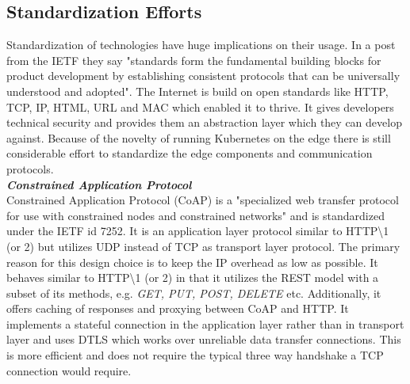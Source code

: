 \subsection{Standardization Efforts}
Standardization of technologies have huge implications on their usage. In a post from the IETF they say "standards form the fundamental building blocks for product development by establishing consistent protocols that can be universally understood and adopted". The Internet is build on open standards like HTTP, TCP, IP, HTML, URL and MAC which enabled it to thrive. It gives developers technical security and provides them an abstraction layer which they can develop against. Because of the novelty of running Kubernetes on the edge there is still considerable effort to standardize the edge components and communication protocols.\\[5mm]
{\textbf{\textit{Constrained Application Protocol}}}\\
Constrained Application Protocol (CoAP) is a "specialized web transfer protocol for use with constrained nodes and constrained networks"\cite{CoAPCon75:online} and is standardized under the IETF id 7252\cite{RFC7252CoAPIETF}. It is an application layer protocol similar to HTTP\textbackslash1 (or 2)  but utilizes UDP instead of TCP as transport layer protocol. The primary reason for this design choice is to keep the IP overhead as low as possible. It behaves similar to HTTP\textbackslash1 (or 2) in that it utilizes the REST model with a subset of its methods, e.g. \textit{GET, PUT, POST, DELETE} etc. Additionally, it offers caching of responses and proxying between CoAP and HTTP. It implements a stateful connection in the application layer rather than in transport layer and uses DTLS which works over unreliable data transfer connections. This is more efficient and does not require the typical three way handshake a TCP connection would require.

